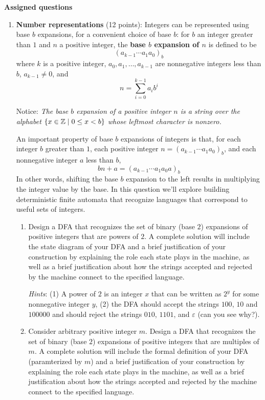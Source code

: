 {\bf Assigned questions}
\begin{enumerate}[wide, labelwidth=!, labelindent=0pt]
\item \textbf{Number representations} (12 points):
Integers can be represented using base $b$ expansions, for a convenient choice of base $b$: 
for $b$ an integer greater than $1$ and $n$ a positive integer, 
the {\bf base $b$ expansion of $n$}  is defined to be
\[
(a_{k-1} \cdots a_1 a_0)_b
\]
where $k$ is a positive integer, $a_0, a_1, \ldots, a_{k-1}$ 
are nonnegative integers less than $b$, $a_{k-1} \neq  0$, and
\[
n =  \sum_{i=0}^{k-1} a_{i} b^{i}
\]

Notice: {\it The base $b$ expansion of a positive integer $n$ is a string over the alphabet 
$\{x \in \mathbb{Z} \mid 0 \leq x < b\}$
whose leftmost character is nonzero.}

An important property of base $b$ expansions of integers is that, for each integer $b$ greater than $1$,
each positive integer $n = (a_{k-1} \cdots a_1 a_0)_b$, and each nonnegative integer $a$ less than $b$, 
\[
    bn + a = (a_{k-1} \cdots a_1 a_0a)_b
\]
In other words, shifting the base $b$ expansion to the left results in multiplying the integer value by the base.
In this question we'll explore building deterministic finite automata that recognize 
languages that correspond to useful sets of integers.

    \begin{enumerate}
    \item\gradeCorrectFirst Design a DFA that recognizes the set of binary (base $2$) expansions of 
    positive integers that are powers of $2$. A complete solution will include the state diagram of your DFA and 
    a brief justification 
    of your construction by explaining the role each state plays in the machine, as well as a brief 
    justification about how the strings accepted and rejected by the machine connect to the specified language.

    {\it Hints}: (1) A power of $2$ is an integer $x$ that can be written as $2^y$ for some nonnegative integer $y$, 
    (2) the DFA should accept the strings $100$, $10$ and $100000$ and should reject the 
    strings $010$, $1101$, and $\varepsilon$ (can you see why?).

    \item\gradeCompleteFirst Consider arbitrary positive integer $m$. Design a DFA that recognizes the 
    set of binary (base $2$) expansions of positive integers that are multiples of $m$. A complete solution will
    include the formal definition of your DFA (paramterized by $m$) and a brief justification of your 
    construction by explaining the role each state plays in the machine, as well as a brief 
    justification about how the strings accepted and rejected by the machine connect to the specified language.


\end{enumerate}
\end{enumerate}
